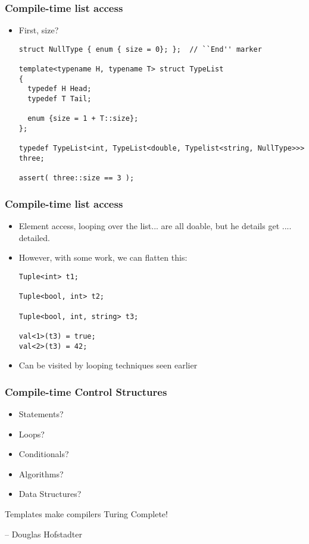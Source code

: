 \begin{frame}[fragile,t]
\frametitle{Compile-time list access}
\begin{itemize}[<+->]
\item First, size?
{\scriptsize\begin{verbatim}
struct NullType { enum { size = 0}; };  // ``End'' marker

template<typename H, typename T> struct TypeList 
{
  typedef H Head;
  typedef T Tail;

  enum {size = 1 + T::size};
};

typedef TypeList<int, TypeList<double, Typelist<string, NullType>>> three;

assert( three::size == 3 );

\end{verbatim}
}
\end{itemize}
\end{frame}

\begin{frame}[fragile,t]
\frametitle{Compile-time list access}
\begin{itemize}[<+->]
\item Element access, looping over the list... are all doable, but he
  details get .... detailed.  
\item However, with some work, we can flatten this:
{\scriptsize\begin{verbatim}
Tuple<int> t1;

Tuple<bool, int> t2;

Tuple<bool, int, string> t3;

val<1>(t3) = true;
val<2>(t3) = 42;
\end{verbatim}
}

\item Can be visited by looping techniques seen earlier
\end{itemize}
\end{frame}


\begin{frame}[fragile,t]
\frametitle{Compile-time Control Structures}
\begin{itemize}[<+->]

\item Statements? \ccheck
\item Loops? \ccheck
\item Conditionals? \ccheck
\item Algorithms?  \ccheck
\item Data Structures? \ccheck
\end{itemize}
\vskip 12pt
\pause
\begin{center}
Templates make compilers Turing Complete!
\end{center}
\pause
\vskip 12pt

\begin{center}

-- Douglas Hofstadter
\end{center}
\end{frame}
